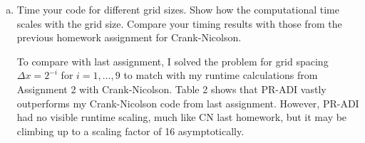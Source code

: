 \documentclass[12pt]{article}
\begin{document}
\begin{enumerate}[(a)]


\item Time your code for different grid sizes. Show how the computational time scales with the grid size. Compare your timing results with those from the previous homework assignment for Crank-Nicolson.

To compare with last assignment, I solved the problem for grid spacing $\Delta x = 2^{-i}$ for $i=1, \dots, 9$ to match with my runtime calculations from Assignment 2 with Crank-Nicolson.  Table 2 shows that PR-ADI vastly outperforms my Crank-Nicolson code from last assignment.  However, PR-ADI had no visible runtime scaling, much like CN last homework, but it may be climbing up to a scaling factor of 16 asymptotically. 


\end{enumerate}
\end{document}
